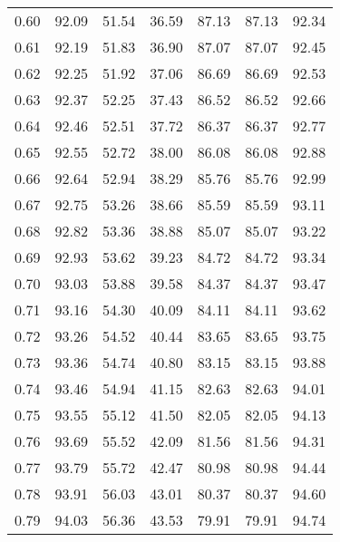 \begin{tabular}{|c|c|c|c|c|c|c|}
      0.60 &     92.09 &     51.54 &      36.59 &   87.13 &      87.13 &         92.34 \\
      0.61 &     92.19 &     51.83 &      36.90 &   87.07 &      87.07 &         92.45 \\
      0.62 &     92.25 &     51.92 &      37.06 &   86.69 &      86.69 &         92.53 \\
      0.63 &     92.37 &     52.25 &      37.43 &   86.52 &      86.52 &         92.66 \\
      0.64 &     92.46 &     52.51 &      37.72 &   86.37 &      86.37 &         92.77 \\
      0.65 &     92.55 &     52.72 &      38.00 &   86.08 &      86.08 &         92.88 \\
      0.66 &     92.64 &     52.94 &      38.29 &   85.76 &      85.76 &         92.99 \\
      0.67 &     92.75 &     53.26 &      38.66 &   85.59 &      85.59 &         93.11 \\
      0.68 &     92.82 &     53.36 &      38.88 &   85.07 &      85.07 &         93.22 \\
      0.69 &     92.93 &     53.62 &      39.23 &   84.72 &      84.72 &         93.34 \\
      0.70 &     93.03 &     53.88 &      39.58 &   84.37 &      84.37 &         93.47 \\
      0.71 &     93.16 &     54.30 &      40.09 &   84.11 &      84.11 &         93.62 \\
      0.72 &     93.26 &     54.52 &      40.44 &   83.65 &      83.65 &         93.75 \\
      0.73 &     93.36 &     54.74 &      40.80 &   83.15 &      83.15 &         93.88 \\
      0.74 &     93.46 &     54.94 &      41.15 &   82.63 &      82.63 &         94.01 \\
      0.75 &     93.55 &     55.12 &      41.50 &   82.05 &      82.05 &         94.13 \\
      0.76 &     93.69 &     55.52 &      42.09 &   81.56 &      81.56 &         94.31 \\
      0.77 &     93.79 &     55.72 &      42.47 &   80.98 &      80.98 &         94.44 \\
      0.78 &     93.91 &     56.03 &      43.01 &   80.37 &      80.37 &         94.60 \\
      0.79 &     94.03 &     56.36 &      43.53 &   79.91 &      79.91 &         94.74 \\

\end{tabular}
